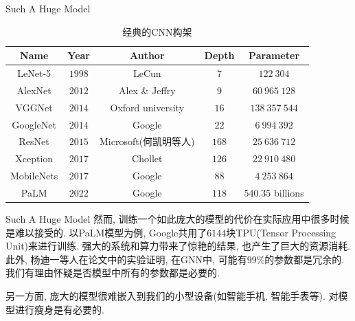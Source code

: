 \documentclass{beamer}
\begin{document}
\begin{frame}{Such A Huge Model}
    \begin{table}[H]
        \centering
        \caption{经典的CNN构架}
        \vspace{-0.3cm}
        \label{tab:cnns}
        \begin{tabular}{ccccc}
        \hline
        Name       & Year & Author            & Depth & Parameter            \\ \hline
        LeNet-5    & $1998$ & LeCun             & $7$     & $122~304$              \\
        AlexNet    & $2012$ & Alex \& Jeffry     & $9$     & $60~965~128$          \\
        VGGNet     & $2014$ & Oxford university & $16$    & $138~357~544$ \\
        GoogleNet  & $2014$ & Google            & $22$    & $6~994~392$            \\
        ResNet     & $2015$ & Microsoft(何凯明等人)  & $168$   & $25~636~712$  \\
        Xception   & $2017$ & Chollet           & $126$   & $22~910~480$           \\
        MobileNets & $2017$ & Google            & $88$    & $4~253~864$            \\
        PaLM       & $2022$ & Google            & $118$     & $540.35$ billions                \\ \hline
        \end{tabular}%
        \end{table}
\end{frame}

\begin{frame}{Such A Huge Model}
    \footnotesize
    然而, 训练一个如此庞大的模型的代价在实际应用中很多时候是难以接受的. 以PaLM模型为例, Google共用了$6144$块TPU(Tensor Processing Unit)来进行训练. 强大的系统和算力带来了惊艳的结果, 也产生了巨大的资源消耗. 此外, 杨迪一\cite{wang2021gnn}等人在论文中的实验证明, 在GNN中, 可能有$99\%$的参数都是冗余的. 我们有理由怀疑是否模型中所有的参数都是必要的. 

    另一方面, 庞大的模型很难嵌入到我们的小型设备(如智能手机, 智能手表等). 对模型进行瘦身是有必要的.

\end{frame}
\end{document}
